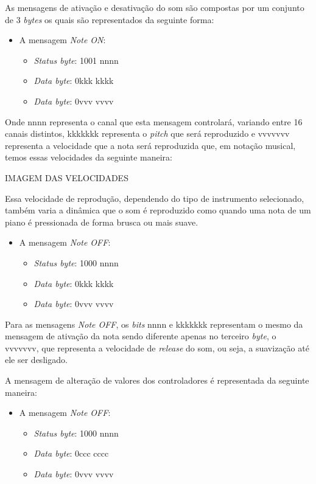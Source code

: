 \documentclass[12pt]{report}
\begin{document}
As mensagens de ativação e desativação do som são compostas por um conjunto de 3 {\it bytes} os quais são representados da seguinte forma:
\begin{itemize}
  \item A mensagem {\it Note ON}:
  \begin{itemize}
    \item {\it Status byte}: 1001 nnnn
    \item {\it Data byte}: 0kkk kkkk
    \item {\it Data byte}: 0vvv vvvv
  \end{itemize}
\end{itemize}

Onde nnnn representa o canal que esta mensagem controlará, variando entre 16 canais distintos, kkkkkkk representa o {\it pitch} que será reproduzido e vvvvvvv representa a velocidade que a nota será reproduzida que, em notação musical, temos essas velocidades da seguinte maneira:

IMAGEM DAS VELOCIDADES

Essa velocidade de reprodução, dependendo do tipo de instrumento selecionado, também varia a dinâmica que o som é reproduzido como quando uma nota de um piano é pressionada de forma brusca ou mais suave.
\begin{itemize}
  \item A mensagem {\it Note OFF}:
  \begin{itemize}
    \item {\it Status byte}: 1000 nnnn
    \item {\it Data byte}: 0kkk kkkk
    \item {\it Data byte}: 0vvv vvvv
  \end{itemize}
\end{itemize}

Para as mensagens {\it Note OFF}, os {\it bits} nnnn e kkkkkkk representam o mesmo da mensagem de ativação da nota sendo diferente apenas no terceiro {\it byte}, o vvvvvvv, que representa a velocidade de {\it release} do som, ou seja, a suavização até ele ser desligado.

A mensagem de alteração de valores dos controladores é representada da seguinte maneira:
\begin{itemize}
  \item A mensagem {\it Note OFF}:
  \begin{itemize}
    \item {\it Status byte}: 1000 nnnn
    \item {\it Data byte}: 0ccc cccc
    \item {\it Data byte}: 0vvv vvvv
  \end{itemize}
\end{itemize}
\end{document}
